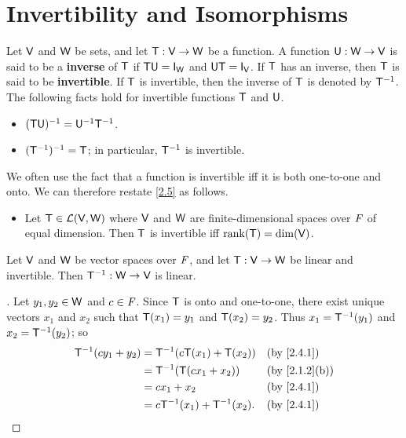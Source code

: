 \section{Invertibility and Isomorphisms}\label{sec:2.4}

\begin{defn}\label{2.4.1}
	Let \(\mathsf{V}\) and \(\mathsf{W}\) be sets, and let \(\mathsf{T} : \mathsf{V} \to \mathsf{W}\) be a function.
	A function \(\mathsf{U} : \mathsf{W} \to \mathsf{V}\) is said to be a \textbf{inverse} of \(\mathsf{T}\) if \(\T \U = \IT[\W]\) and \(\U \T = \IT[\V]\).
	If \(\mathsf{T}\) has an inverse, then \(\mathsf{T}\) is said to be \textbf{invertible}.
	If \(\mathsf{T}\) is invertible, then the inverse of \(\mathsf{T}\) is denoted by \(\mathsf{T}^{-1}\).
	The following facts hold for invertible functions \(\mathsf{T}\) and \(\mathsf{U}\).
	\begin{itemize}
		\item \((\mathsf{T} \mathsf{U})^{-1} = \mathsf{U}^{-1} \mathsf{T}^{-1}\).
		\item \((\mathsf{T}^{-1})^{-1} = \mathsf{T}\);
		      in particular, \(\mathsf{T}^{-1}\) is invertible.
	\end{itemize}
	We often use the fact that a function is invertible iff it is both one-to-one and onto.
	We can therefore restate \cref{2.5} as follows.
	\begin{itemize}
		\item Let \(\mathsf{T} \in \mathcal{L}(\mathsf{V}, \mathsf{W})\) where \(\mathsf{V}\) and \(\mathsf{W}\) are finite-dimensional spaces over \(\mathit{F}\) of equal dimension.
		      Then \(\mathsf{T}\) is invertible iff \(\rk{\T} = \dim(\V)\).
	\end{itemize}
\end{defn}

\begin{thm}\label{2.17}
	Let \(\mathsf{V}\) and \(\mathsf{W}\) be vector spaces over \(\mathit{F}\), and let \(\mathsf{T} : \mathsf{V} \to \mathsf{W}\) be linear and invertible.
	Then \(\mathsf{T}^{-1} : \mathsf{W} \to \mathsf{V}\) is linear.
\end{thm}

\begin{proof}[]
	Let \(y_1, y_2 \in \mathsf{W}\) and \(c \in \mathit{F}\).
	Since \(\mathsf{T}\) is onto and one-to-one, there exist unique vectors \(x_1\) and \(x_2\) such that \(\mathsf{T}(x_1) = y_1\) and \(\mathsf{T}(x_2) = y_2\).
	Thus \(x_1 = \mathsf{T}^{-1}(y_1)\) and \(x_2 = \mathsf{T}^{-1}(y_2)\);
	so
	\begin{align*}
		\T^{-1}(c y_1 + y_2) & = \T^{-1}(c \T(x_1) + \T(x_2))   &  & \by{2.4.1}    \\
		                     & = \T^{-1}(\T(c x_1 + x_2))       &  & \by{2.1.2}[b] \\
		                     & = c x_1 + x_2                    &  & \by{2.4.1}    \\
		                     & = c \T^{-1}(x_1) + \T^{-1}(x_2). &  & \by{2.4.1}
	\end{align*}
\end{proof}

